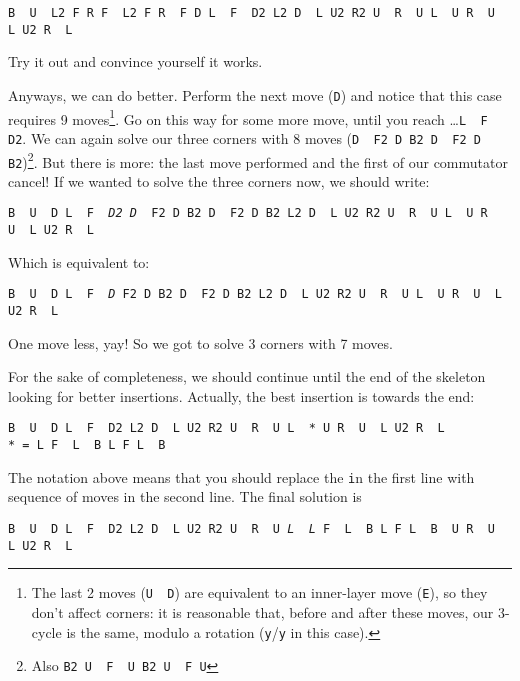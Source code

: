 \documentclass[11pt,a4paper]{book}
\newcommand{\p}{\textquotesingle}
\newcommand{\m}{\texttt}
\newcommand{\ps}{\p\,\,}
\begin{document}
\begin{center}
\m{B\ps U\ps {\color{red}L2 F R F\ps L2 F R\ps F\p} D L\ps F\ps D2 L2 D\ps L U2 R2 U\ps R\ps U L\ps U R\ps U\ps L U2 R\ps L\ps}
\end{center}

Try it out and convince yourself it works.

Anyways, we can do better. Perform the next move (\m D) and notice that this case requires 9 moves\footnote{The last 2 moves (\m{U\ps D}) are equivalent to an inner-layer move (\m{E\p}), so they don't affect corners: it is reasonable that, before and after these moves, our 3-cycle is the same, modulo a rotation (\m{y\p}/\m{y} in this case).}. Go on this way for some more move, until you reach \dots\m{L\ps F\ps D2}. We can again solve our three corners with 8 moves (\m{D\ps F2 D B2 D\ps F2 D B2})\footnote{Also \m{B2 U\ps F\ps U B2 U\ps F U}}. But there is more: the last move performed and the first of our commutator cancel! If we wanted to solve the three corners now, we should write:

\begin{center}
\m{B\ps U\ps D L\ps F\ps \emph{D2} {\color{red}\emph{D}\ps F2 D B2 D\ps F2 D B2} L2 D\ps L U2 R2 U\ps R\ps U L\ps U R\ps U\ps L U2 R\ps L\p}
\end{center}

Which is equivalent to:

\begin{center}
\m{B\ps U\ps D L\ps F\ps {\color{red}\emph{D} F2 D B2 D\ps F2 D B2} L2 D\ps L U2 R2 U\ps R\ps U L\ps U R\ps U\ps L U2 R\ps L\p}
\end{center}

One move less, yay! So we got to solve 3 corners with 7 moves.

For the sake of completeness, we should continue until the end of the skeleton looking for better insertions. Actually, the best insertion is towards the end:

\begin{center}
\m{B\ps U\ps D L\ps F\ps D2 L2 D\ps L U2 R2 U\ps R\ps U L\ps * U R\ps U\ps L U2 R\ps L\p}\\
\m{* = L F\ps L\ps B L F L\ps B\p}
\end{center}

The notation above means that you should replace the \m * in the first line with sequence of moves in the second line. The final solution is

\begin{center}
\m{B\ps U\ps D L\ps F\ps D2 L2 D\ps L U2 R2 U\ps R\ps U \emph{L\ps L} F\ps L\ps B L F L\ps B\ps U R\ps U\ps L U2 R\ps L\p}
\end{center}
\end{document}
